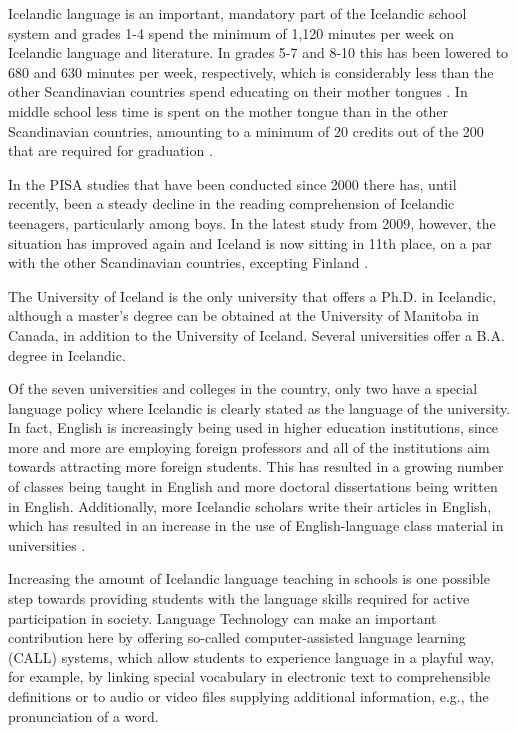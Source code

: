 \documentclass{../../metanetpaper}
\begin{document}
\begin{multicols}{2}
Icelandic language is an important, mandatory part of the Icelandic school system and grades 1-4 spend the minimum of 1,120 minutes per week on Icelandic language and literature. In grades 5-7 and 8-10 this has been lowered to 680 and 630 minutes per week, respectively, which is considerably less than the other Scandinavian countries spend educating on their mother tongues \cite{men2}.  In middle school less time is spent on the mother tongue than in the other Scandinavian countries, amounting to a minimum of 20 credits out of the 200 that are required for graduation \cite{men3}.

In the PISA studies that have been conducted since 2000 there has, until recently, been a steady decline in the reading comprehension of Icelandic teenagers, particularly among boys. In the latest study from 2009, however, the situation has improved again and Iceland is now sitting in 11th place, on a par with the other Scandinavian countries, excepting Finland \cite{nam1}. 

The University of Iceland is the only university that offers a Ph.D. in Icelandic, although a master’s degree can be obtained at the University of Manitoba in Canada, in addition to the University of Iceland. Several universities offer a B.A. degree in Icelandic.

Of the seven universities and colleges in the country, only two have a special language policy where Icelandic is clearly stated as the language of the university. In fact, English is increasingly being used in higher education institutions, since more and more are employing foreign professors and all of the institutions aim towards attracting more foreign students. This has resulted in a growing number of classes being taught in English and more doctoral dissertations being written in English. Additionally, more Icelandic scholars write their articles in English, which has resulted in an increase in the use of English-language class material in universities \cite{isl1}. 


Increasing the amount of Icelandic language teaching in schools is one possible step towards providing students with the language skills required for active participation in society. Language Technology can make an important contribution here by offering so-called computer-assisted language learning (CALL) systems, which allow students to experience language in a playful way, for example, by linking special vocabulary in electronic text to comprehensible definitions or to audio or video files supplying additional information, e.g., the pronunciation of a word.


\end{multicols}
\end{document}
